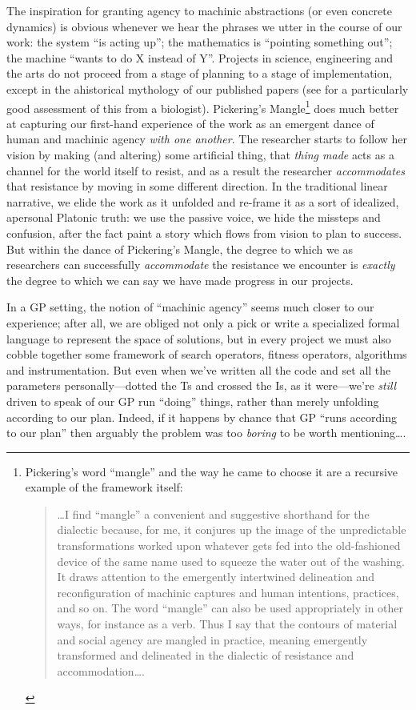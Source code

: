 The inspiration for granting agency to machinic abstractions (or even concrete dynamics) is obvious whenever we hear the phrases we utter in the course of our work: the system ``is acting up''; the mathematics is ``pointing something out''; the machine ``wants to do X instead of Y''. Projects in science, engineering and the arts do not proceed from a stage of planning to a stage of implementation, except in the ahistorical mythology of our published papers (see \citep{Koutalos:2008} for a particularly good assessment of this from a biologist). Pickering's Mangle\footnote{Pickering's word ``mangle'' and the way he came to choose it are a recursive example of the framework itself:

\begin{quote}
\ldots{}I find ``mangle'' a convenient and suggestive shorthand for the dialectic because, for me, it conjures up the image of the unpredictable transformations worked upon whatever gets fed into the old-fashioned device of the same name used to squeeze the water out of the washing. It draws attention to the emergently intertwined delineation and reconfiguration of machinic captures and human intentions, practices, and so on. The word ``mangle'' can also be used appropriately in other ways, for instance as a verb. Thus I say that the contours of material and social agency are mangled in practice, meaning emergently transformed and delineated in the dialectic of resistance and accommodation\ldots{}.
\end{quote}} does much better at capturing our first-hand experience of the work as an emergent dance of human and machinic agency \emph{with one another}. The researcher starts to follow her vision by making (and altering) some artificial thing, that \emph{thing made} acts as a channel for the world itself to resist, and as a result the researcher \emph{accommodates} that resistance by moving in some different direction. In the traditional linear narrative, we elide the work as it unfolded and re-frame it as a sort of idealized, apersonal Platonic truth: we use the passive voice, we hide the missteps and confusion, after the fact paint a story which flows from vision to plan to success. But within the dance of Pickering's Mangle, the degree to which we as researchers can successfully \emph{accommodate} the resistance we encounter is \emph{exactly} the degree to which we can say we have made progress in our projects.

In a GP setting, the notion of ``machinic agency'' seems much closer to our experience; after all, we are obliged not only a pick or write a specialized formal language to represent the space of solutions, but in every project we must also cobble together some framework of search operators, fitness operators, algorithms and instrumentation. But even when we've written all the code and set all the parameters personally---dotted the Ts and crossed the Is, as it were---we're \emph{still} driven to speak of our GP run ``doing'' things, rather than merely unfolding according to our plan. Indeed, if it happens by chance that GP ``runs according to our plan'' then arguably the problem was too \emph{boring} to be worth mentioning\ldots{}.


